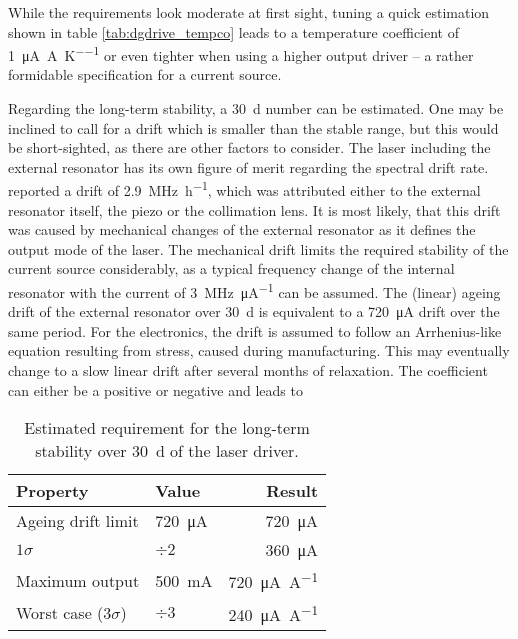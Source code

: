 While the requirements look moderate at first sight, tuning a quick estimation shown in table \ref{tab:dgdrive_tempco} leads to a temperature coefficient of \qty[per-mode = symbol]{1}{\uA \per \A \per \K} or even tighter when using a higher output driver -- a rather formidable specification for a current source.

Regarding the long-term stability, a \qty{30}{\day} number can be estimated. One may be inclined to call for a drift which is smaller than the stable range, but this would be short-sighted, as there are other factors to consider. The laser including the external resonator has its own figure of merit regarding the spectral drift rate. \citeauthor{ecdl_stability} \cite{ecdl_stability} reported a drift of \qty{2.9}{\MHz \per \hour}, which was attributed either to the external resonator itself, the piezo or the collimation lens. It is most likely, that this drift was caused by mechanical changes of the external resonator as it defines the output mode of the laser. The mechanical drift limits the required stability of the current source considerably, as a typical frequency change of the internal resonator with the current of \qty[per-mode=symbol]{3}{\MHz \per \micro \A} \cite{diodelaser_modulation} can be assumed. The (linear) ageing drift of the external resonator over \qty{30}{\day} is equivalent to a \qty{720}{\uA} drift over the same period. For the electronics, the drift is assumed to follow an Arrhenius-like equation resulting from stress, caused during manufacturing. This may eventually change to a slow linear drift after several months of relaxation. The coefficient can either be a positive or negative and leads to

\begin{table}[hb]
    \centering
    \begin{tabular}{llr}
        \toprule
        Property& Value& Result \\
        \midrule
        Ageing drift limit & \qty{720}{\uA}& \qty{720}{\uA}\\
        $1 \sigma$  & $\div 2$& \qty{360}{\uA} \\
        Maximum output& \qty{500}{\mA}& \qty{720}{\uA \per \A}\\
        Worst case ($3 \sigma$)& $\div 3$& \qty{240}{\uA \per \A}\\
        \bottomrule
    \end{tabular}
    \caption{Estimated requirement for the long-term stability over \qty{30}{\day} of the laser driver.}
    \label{tab:dgdrive_stability}
\end{table}

